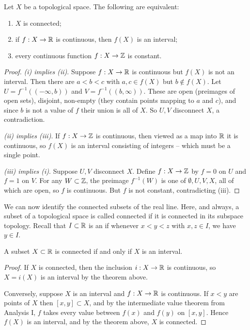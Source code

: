 \documentclass[a4paper]{scrartcl}
\begin{document}
\begin{theorem}\label{thm:connchar}
    Let $X$ be a topological space. The following are equivalent:
    \begin{enumerate}[label=(\roman*)]
        \item $X$ is connected;
        \item if $f: X \rightarrow \mathbb{R}$ is continuous, then $f(X)$ is an interval;
        \item every continuous function $f: X \rightarrow \mathbb{Z}$ is constant.
    \end{enumerate}
\end{theorem}
\begin{proof}
    \emph{(i) implies (ii)}. Suppose $f: X \rightarrow \mathbb{R}$ is continuous but $f(X)$ is not an interval. Then there are $a < b < c$ with $a, c \in f(X)$ but $b \not \in f(X)$. Let $U = f^{-1}((-\infty, b))$ and $V = f^{-1}((b, \infty))$. These are open (preimages of open sets), disjoint, non-empty (they contain points mapping to $a$ and $c$), and since $b$ is not a value of $f$ their union is all of $X$. So $U, V$ disconnect $X$, a contradiction.

    \emph{(ii) implies (iii)}. If $f: X \rightarrow \mathbb{Z}$ is continuous, then viewed as a map into $\mathbb{R}$ it is continuous, so $f(X)$ is an interval consisting of integers -- which must be a single point.

    \emph{(iii) implies (i)}. Suppose $U, V$ disconnect $X$. Define $f: X \rightarrow \mathbb{Z}$ by $f = 0$ on $U$ and $f = 1$ on $V$. For any $W \subset \mathbb{Z}$, the preimage $f^{-1}(W)$ is one of $\emptyset, U, V, X$, all of which are open, so $f$ is continuous. But $f$ is not constant, contradicting (iii).
\end{proof}

We can now identify the connected subsets of the real line. Here, and always, a subset of a topological space is called connected if it is connected in its subspace topology. Recall that $I \subset \mathbb{R}$ is an  if whenever $x < y < z$ with $x, z \in I$, we have $y \in I$.

\begin{theorem}
    A subset $X \subset \mathbb{R}$ is connected if and only if $X$ is an interval.
\end{theorem}
\begin{proof}
    If $X$ is connected, then the inclusion $i: X \rightarrow \mathbb{R}$ is continuous, so $X = i(X)$ is an interval by the theorem above.

    Conversely, suppose $X$ is an interval and $f: X \rightarrow \mathbb{R}$ is continuous. If $x < y$ are points of $X$ then $[x, y] \subset X$, and by the intermediate value theorem from Analysis I, $f$ takes every value between $f(x)$ and $f(y)$ on $[x, y]$. Hence $f(X)$ is an interval, and by the theorem above, $X$ is connected.
\end{proof}
\end{document}
